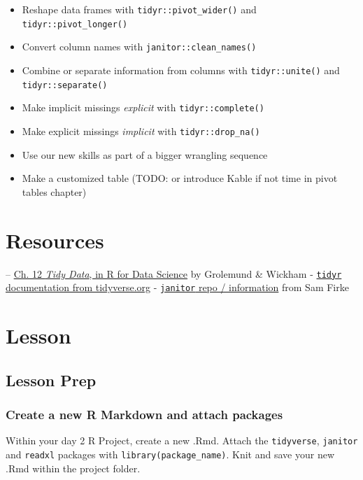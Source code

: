 \documentclass[]{book}
\providecommand{\tightlist}{%
  \setlength{\itemsep}{0pt}\setlength{\parskip}{0pt}}
\begin{document}
\begin{itemize}
\tightlist
\item
  Reshape data frames with \texttt{tidyr::pivot\_wider()} and \texttt{tidyr::pivot\_longer()}
\item
  Convert column names with \texttt{janitor::clean\_names()}
\item
  Combine or separate information from columns with \texttt{tidyr::unite()} and \texttt{tidyr::separate()}
\item
  Make implicit missings \emph{explicit} with \texttt{tidyr::complete()}
\item
  Make explicit missings \emph{implicit} with \texttt{tidyr::drop\_na()}
\item
  Use our new skills as part of a bigger wrangling sequence
\item
  Make a customized table (TODO: or introduce Kable if not time in pivot tables chapter)
\end{itemize}

\hypertarget{resources-6}{%
\section{Resources}\label{resources-6}}

-- \href{https://r4ds.had.co.nz/tidy-data.html}{Ch. 12 \emph{Tidy Data}, in R for Data Science} by Grolemund \& Wickham
- \href{https://tidyr.tidyverse.org/}{\texttt{tidyr} documentation from tidyverse.org}
- \href{https://github.com/sfirke/janitor}{\texttt{janitor} repo / information} from Sam Firke

\hypertarget{lesson-2}{%
\section{Lesson}\label{lesson-2}}

\hypertarget{lesson-prep}{%
\subsection{Lesson Prep}\label{lesson-prep}}

\hypertarget{create-a-new-r-markdown-and-attach-packages}{%
\subsubsection{Create a new R Markdown and attach packages}\label{create-a-new-r-markdown-and-attach-packages}}

Within your day 2 R Project, create a new .Rmd. Attach the \texttt{tidyverse}, \texttt{janitor} and \texttt{readxl} packages with \texttt{library(package\_name)}. Knit and save your new .Rmd within the project folder.
\end{document}
